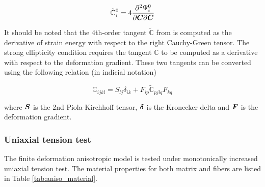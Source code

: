 \documentclass[12pt]{article}
\numberwithin{equation}{section}
\begin{document}
\begin{equation}\label{eq:aniso_tangent2}
  \tilde{\mathbb{C}}_i^0 =  
    4 \frac{\partial ^2 \Psi_i^0}{\partial{\boldsymbol{C}} \partial{\boldsymbol{C}}}
\end{equation}

It should be noted that the 4th-order tangent $\tilde{\mathbb{C}}$ 
from  is computed as the derivative of strain 
energy with respect to the right Cauchy-Green tensor. The strong 
ellipticity condition  requires the 
tangent $\mathbb{C}$ to be computed as a derivative with respect to 
the deformation gradient. These two tangents can be converted using 
the following relation (in indicial notation)

\begin{equation}
  \mathbb{C}_{ijkl} = S_{lj}\delta_{ik}
    + F_{ip} \tilde{\mathbb{C}}_{pjlq} F_{kq}
\end{equation}

where ${\boldsymbol{S}}$ is the 2nd Piola-Kirchhoff tensor, ${\boldsymbol{\delta}}$ is the 
Kronecker delta and ${\boldsymbol{F}}$ is the deformation gradient.

\subsubsection{Uniaxial tension test}

The finite deformation anisotropic model is tested under monotonically
increased uniaxial tension test. The material properties for both 
matrix and fibers are listed in Table \ref{tab:aniso_material}.
\end{document}
